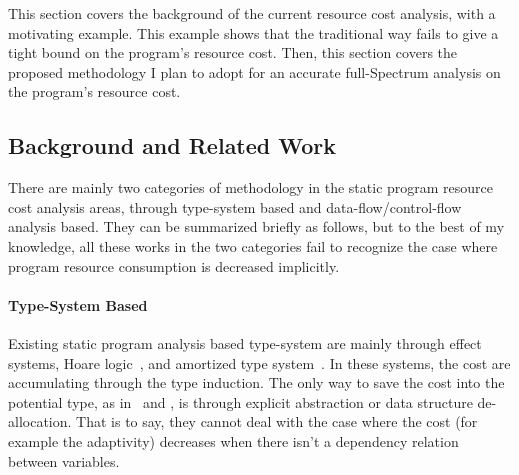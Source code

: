 This section covers the background of the current resource cost analysis,
with a 
motivating example.
This example shows that the traditional way fails to give a tight bound on the program's resource cost.
Then, this section covers the proposed methodology I plan to adopt for an accurate full-Spectrum
analysis on 
the program's resource cost.
\subsection*{Background and Related Work}
There are mainly two categories of methodology in the static program resource cost analysis areas, 
through type-system based  and data-flow/control-flow analysis based. 
They can be summarized briefly as follows, but to the best of my knowledge,
all these works in the two categories fail to recognize the case where program resource consumption is decreased implicitly.
 \paragraph*{Type-System Based}
Existing
static program analysis based type-system are mainly through 
effect systems, 
Hoare logic~\cite{gaboardi2021graded}, and amortized type system~\cite{hoffmann_jost_2022}.
%
In these systems, the cost are accumulating through the type induction. 
The only way to save the cost into the potential
type, as in~\cite{GustafssonEL05} and \cite{hoffmann_jost_2022}, 
is through explicit abstraction or data structure de-allocation.
That is to say, they cannot deal with the case where the cost (for example the adaptivity) decreases when there isn't a dependency relation between variables.
